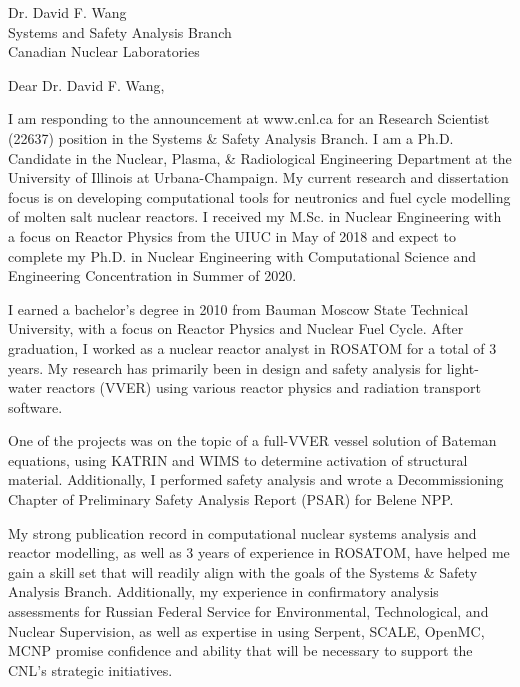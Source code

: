 \documentclass[11pt]{letter} %
\newcommand{\RecipientName}{Dr. David F. Wang\xspace}
\newcommand{\RecipientAddress}{Systems and Safety Analysis Branch \\
Canadian Nuclear Laboratories}
\begin{document}
\begin{letter}{\RecipientName\\
        \RecipientAddress\xspace}

\address{Andrei Rykhlevskii\\
andreir2@illinois.edu\\
226 Talbot Laboratory\\
104 Wright Street\\
Urbana, IL 61801}


\opening{Dear \RecipientName,}

I am responding to the announcement at www.cnl.ca for an Research Scientist  
(22637) position in the Systems \& Safety Analysis Branch. I am a Ph.D. 
Candidate in the Nuclear, Plasma, \& Radiological Engineering Department at 
the University of Illinois at Urbana-Champaign. My current research and 
dissertation focus is on developing computational tools for neutronics and 
fuel cycle modelling of molten salt nuclear reactors.  I received my M.Sc. in 
Nuclear Engineering with a focus on Reactor Physics from the UIUC in May of 
2018 and expect to complete my Ph.D. in Nuclear Engineering with Computational 
Science and Engineering Concentration in Summer of 2020.

I earned a bachelor’s degree in 2010 from Bauman Moscow State Technical 
University, with a focus on Reactor Physics and Nuclear Fuel Cycle. After 
graduation, I worked as a nuclear reactor analyst in ROSATOM for a total of 3 
years. My research has primarily been in design and safety analysis for 
light-water reactors (VVER) using various reactor physics and radiation 
transport software.

One of the projects was on the topic of a full-VVER vessel solution of Bateman 
equations, using KATRIN and WIMS to determine activation of structural 
material. Additionally, I performed safety analysis and wrote 
a Decommissioning Chapter of Preliminary Safety Analysis Report (PSAR) for 
Belene NPP.

My strong publication record in computational nuclear systems analysis and 
reactor modelling, as well as 3 years of experience in ROSATOM, have helped me 
gain a skill set that will readily align with the goals of the Systems \& 
Safety Analysis Branch. Additionally, my experience in confirmatory analysis 
assessments for Russian Federal Service for Environmental, Technological, and 
Nuclear Supervision, as well as expertise in using Serpent, SCALE, OpenMC, 
MCNP promise confidence and ability that will be necessary to support the 
CNL's strategic initiatives. 


\end{letter}
\end{document}
